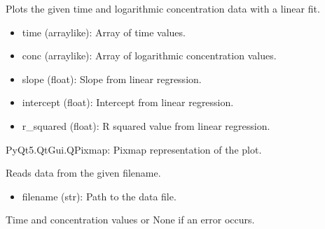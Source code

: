 \documentclass[a4paper,10pt,english]{sphinxmanual}
\begin{document}
\begin{fulllineitems}
\label{\detokenize{utils:src.utils.rate_const.plot}}
\pysigstartsignatures
{}
\pysigstopsignatures
\sphinxAtStartPar
Plots the given time and logarithmic concentration data with a linear fit.
\begin{description}
\begin{itemize}
\item {} 
\sphinxAtStartPar
time (array\sphinxhyphen{}like): Array of time values.

\item {} 
\sphinxAtStartPar
conc (array\sphinxhyphen{}like): Array of logarithmic concentration values.

\item {} 
\sphinxAtStartPar
slope (float): Slope from linear regression.

\item {} 
\sphinxAtStartPar
intercept (float): Intercept from linear regression.

\item {} 
\sphinxAtStartPar
r\_squared (float): R squared value from linear regression.

\end{itemize}

\sphinxAtStartPar
PyQt5.QtGui.QPixmap: Pixmap representation of the plot.

\end{description}

\end{fulllineitems}


\begin{fulllineitems}
\label{\detokenize{utils:src.utils.rate_const.read_data}}
\pysigstartsignatures
{}
\pysigstopsignatures
\sphinxAtStartPar
Reads data from the given filename.
\begin{description}
\begin{itemize}
\item {} 
\sphinxAtStartPar
filename (str): Path to the data file.

\end{itemize}

\sphinxAtStartPar
Time and concentration values or None if an error occurs.

\end{description}

\end{fulllineitems}
\end{document}
